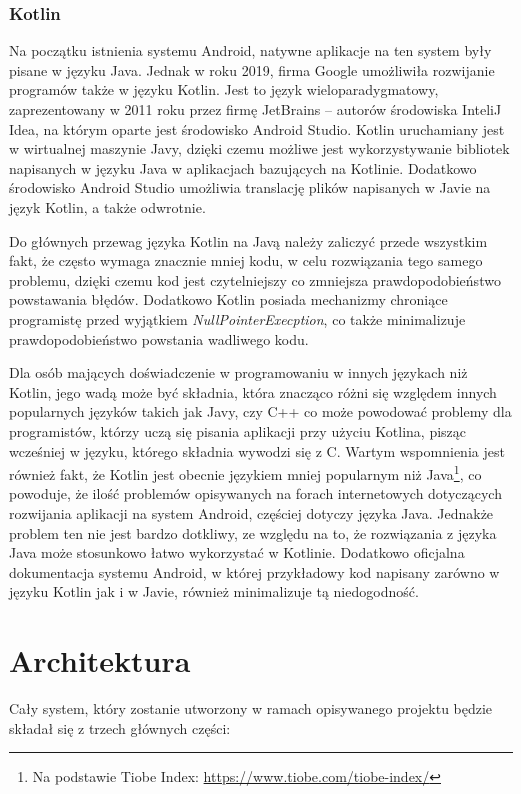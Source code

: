 \documentclass[a4paper,12pt,twoside,openany]{report}
\begin{document}
\subsection{Kotlin}
Na początku istnienia systemu Android, natywne aplikacje na ten system były pisane w języku Java. Jednak w roku 2019, firma Google umożliwiła rozwijanie programów także w języku Kotlin. Jest to język wieloparadygmatowy, zaprezentowany w 2011 roku przez firmę JetBrains -- autorów środowiska InteliJ Idea, na którym oparte jest środowisko Android Studio. Kotlin uruchamiany jest w wirtualnej maszynie Javy, dzięki czemu możliwe jest wykorzystywanie bibliotek napisanych w języku Java w aplikacjach bazujących na Kotlinie. Dodatkowo środowisko Android Studio umożliwia translację plików napisanych w Javie na język Kotlin, a także odwrotnie. 

Do głównych przewag języka Kotlin na Javą należy zaliczyć przede wszystkim fakt, że często wymaga znacznie mniej kodu, w celu rozwiązania tego samego problemu, dzięki czemu kod jest czytelniejszy co zmniejsza prawdopodobieństwo powstawania błędów. Dodatkowo Kotlin posiada mechanizmy chroniące programistę przed wyjątkiem \textit{NullPointerExecption}, co także minimalizuje prawdopodobieństwo powstania wadliwego kodu. 

Dla osób mających doświadczenie w programowaniu w innych językach niż Kotlin, jego wadą może być składnia, która znacząco różni się względem innych popularnych języków takich jak Javy, czy C++ co może powodować problemy dla programistów, którzy uczą się pisania aplikacji przy użyciu  Kotlina, pisząc wcześniej w języku, którego składnia wywodzi się z C. Wartym wspomnienia jest również fakt, że Kotlin jest obecnie językiem mniej popularnym niż Java\footnote{Na podstawie Tiobe Index: \url{ https://www.tiobe.com/tiobe-index/}}, co powoduje, że ilość problemów opisywanych na forach internetowych dotyczących rozwijania aplikacji na system Android, częściej dotyczy języka Java. Jednakże problem ten nie jest bardzo dotkliwy, ze względu na to, że rozwiązania z języka Java może stosunkowo łatwo wykorzystać w Kotlinie. Dodatkowo oficjalna dokumentacja systemu Android, w której przykładowy kod napisany zarówno w języku Kotlin jak i w Javie, również minimalizuje tą niedogodność. 

\chapter{Architektura}
Cały system, który zostanie utworzony w ramach opisywanego projektu będzie składał się z trzech głównych części: 
\end{document}
